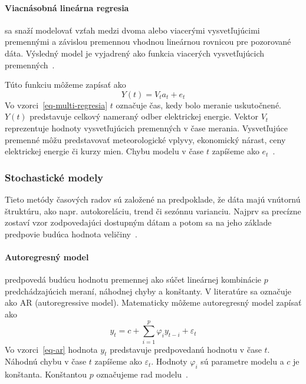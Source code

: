 \documentclass[a4paper,slovak,12pt,appendix]{article}
\begin{document}
\paragraph{Viacnásobná lineárna regresia} sa snaží modelovať vzťah medzi dvoma
alebo viacerými vysvetľujúcimi premennými a závislou premennou vhodnou
lineárnou rovnicou pre pozorované dáta. Výsledný model je vyjadrený ako funkcia
viacerých vysvetľujúcich premenných~\cite{Grmanova2016}.

Túto funkciu môžeme zapísať ako
\begin{equation}
  Y(t) = V_t a_t + e_t
  \label{eq-multi-regresia}
\end{equation}
Vo vzorci~\ref{eq-multi-regresia} $t$ označuje čas, kedy bolo meranie
uskutočnené. $Y(t)$ predstavuje celkový nameraný odber elektrickej energie.
Vektor $V_t$ reprezentuje hodnoty vysvetľujúcich premenných v čase merania.
Vysvetľujúce premenné môžu predstavovať meteorologické vplyvy, ekonomický
nárast, ceny elektrickej energie či kurzy mien. Chybu modelu v čase $t$
zapíšeme ako $e_t$~\cite{KumarSingh2013, Mahalakshmi2016}.


\subsubsection{Stochastické modely}
\label{stochastic}
Tieto metódy časových radov sú založené na predpoklade, že dáta majú vnútornú
štruktúru, ako napr. autokoreláciu, trend či sezónnu varianciu. Najprv sa
precízne zostaví vzor zodpovedajúci dostupným dátam a potom sa na jeho základe
predpovie budúca hodnota veličiny~\cite{KumarSingh2013}.

\paragraph{Autoregresný model} predpovedá budúcu hodnotu premennej ako súčet
lineárnej kombinácie $p$ predchádzajúcich meraní, náhodnej chyby a konštanty.
V literatúre sa označuje ako AR (autoregressive model). Matematicky môžeme
autoregresný model zapísať ako
\begin{equation}
  y_t = c + \sum_{i=1}^{p} \varphi_i y_{t-i} + \varepsilon_t
  \label{eq-ar}
\end{equation}
Vo vzorci~\ref{eq-ar} hodnota $y_t$ predstavuje predpovedanú hodnotu
v čase $t$. Náhodnú chybu v čase $t$ zapíšeme ako $\varepsilon_t$. Hodnoty
$\varphi_i$ sú parametre modelu a $c$ je konštanta. Konštantou $p$ označujeme
rad modelu~\cite{Agrawal2013}.
\end{document}
